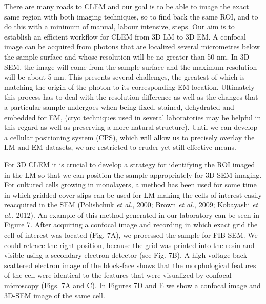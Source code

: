 \documentclass{article}
\begin{document}
There are many roads to CLEM and our goal is to be able to image the exact same region with both imaging techniques, so to find back the same ROI, and to do this with a minimum of manual, labour intensive, steps. Our aim is to establish an efficient workflow for CLEM from 3D LM to 3D EM. A confocal image can be acquired from photons that are localized several micrometres below the sample surface and whose resolution will be no greater than 50 nm. In 3D SEM, the image will come from the sample surface and the maximum resolution will be about 5 nm. This presents several challenges, the greatest of which is matching the origin of the photon to its corresponding EM location. Ultimately this process has to deal with the resolution difference as well as the changes that a particular sample undergoes when being fixed, stained, dehydrated and embedded for EM, (cryo techniques used in several laboratories may be helpful in this regard as well as preserving a more natural structure). Until we can develop a cellular positioning system (CPS), which will allow us to precisely overlay the LM and EM datasets, we are restricted to cruder yet still effective means.

For 3D CLEM it is crucial to develop a strategy for identifying the ROI imaged in the LM so that we can position the sample appropriately for 3D-SEM imaging. For cultured cells growing in monolayers, a method has been used for some time in which gridded cover slips can be used for LM making the cells of interest easily reacquired in the SEM (Polishchuk \textit{et al.}, 2000; Brown \textit{et al.}, 2009; Kobayashi \textit{et al.}, 2012). An example of this method generated in our laboratory can be seen in Figure 7. After acquiring a confocal image and recording in which exact grid the cell of interest was located (Fig. 7A), we processed the sample for FIB-SEM. We could retrace the right position, because the grid was printed into the resin and visible using a secondary electron detector (see Fig. 7B). A high voltage back-scattered electron image of the block-face shows that the morphological features of the cell were identical to the features that were visualized by confocal microscopy (Figs. 7A and C). In Figures 7D and E we show a confocal image and 3D-SEM image of the same cell.
\end{document}
